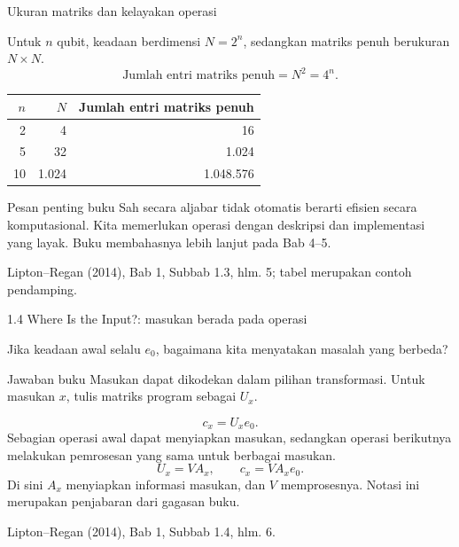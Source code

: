 \documentclass[aspectratio=169,11pt]{beamer}
\newcommand{\bookref}[1]{\par\vfill{\scriptsize\color{gray}Lipton--Regan (2014), Bab 1, #1.}}
\begin{document}
\begin{frame}{Ukuran matriks dan kelayakan operasi}
\small

Untuk $n$ qubit, keadaan berdimensi $N=2^n$, sedangkan matriks penuh berukuran $N\times N$.
\[
 \text{Jumlah entri matriks penuh}=N^2=4^n.
\]
\begin{center}
\begin{tabular}{rrr}\toprule
$n$ & $N$ & Jumlah entri matriks penuh\\\midrule
2 & 4 & 16\\
5 & 32 & 1.024\\
10 & 1.024 & 1.048.576\\\bottomrule
\end{tabular}
\end{center}
\begin{block}{Pesan penting buku}
Sah secara aljabar tidak otomatis berarti efisien secara komputasional. Kita memerlukan operasi dengan deskripsi dan implementasi yang layak. Buku membahasnya lebih lanjut pada Bab 4--5.
\end{block}
\bookref{Subbab 1.3, hlm. 5; tabel merupakan contoh pendamping}

\end{frame}

\begin{frame}{1.4 Where Is the Input?: masukan berada pada operasi}
\small

Jika keadaan awal selalu $e_0$, bagaimana kita menyatakan masalah yang berbeda?
\begin{block}{Jawaban buku}
Masukan dapat dikodekan dalam pilihan transformasi. Untuk masukan $x$, tulis matriks program sebagai $U_x$.
\end{block}
\[
 c_x=U_xe_0.
\]
Sebagian operasi awal dapat menyiapkan masukan, sedangkan operasi berikutnya melakukan pemrosesan yang sama untuk berbagai masukan.
\[
 U_x=V A_x,\qquad c_x=V A_xe_0.
\]
Di sini $A_x$ menyiapkan informasi masukan, dan $V$ memprosesnya. Notasi ini merupakan penjabaran dari gagasan buku.
\bookref{Subbab 1.4, hlm. 6}

\end{frame}
\end{document}
